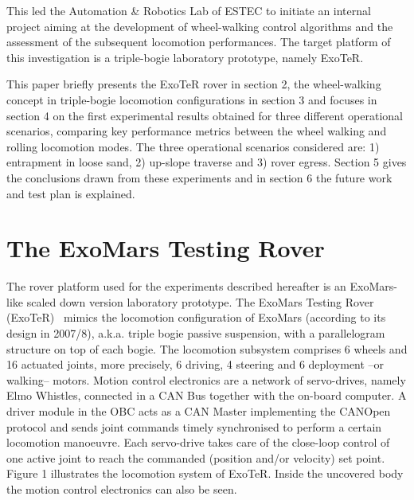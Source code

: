 \documentclass[a4paper,twocolumn]{esapub2005} %
\begin{document}
This led the Automation \& Robotics Lab of ESTEC to initiate an internal
project aiming at the development of wheel-walking control algorithms and the
assessment of the subsequent locomotion performances. The target platform of
this investigation is a triple-bogie laboratory prototype, namely ExoTeR.

This paper briefly presents the ExoTeR rover in section 2, the wheel-walking
concept in triple-bogie locomotion configurations in section 3 and focuses in
section 4 on the first experimental results obtained for three different
operational scenarios, comparing key performance metrics between the wheel
walking and rolling locomotion modes. The three operational scenarios
considered are: 1) entrapment in loose sand, 2) up-slope traverse and 3) rover
egress. Section 5 gives the conclusions drawn from these experiments and in
section 6 the future work and test plan is explained.

\section{The ExoMars Testing Rover}

The rover platform used for the experiments described hereafter is an
ExoMars-like scaled down version laboratory prototype. The ExoMars Testing
Rover (ExoTeR)~\cite{Azkarate2015} mimics the locomotion configuration of
ExoMars (according to its design in 2007/8), a.k.a. triple bogie passive
suspension, with a parallelogram structure on top of each bogie. The locomotion
subsystem comprises 6 wheels and 16 actuated joints, more precisely, 6 driving,
4 steering and 6 deployment –or walking– motors.  Motion control electronics
are a network of servo-drives, namely Elmo Whistles, connected in a CAN Bus
together with the on-board computer. A driver module in the OBC acts as a CAN
Master implementing the CANOpen protocol and sends joint commands timely
synchronised to perform a certain locomotion manoeuvre. Each servo-drive takes
care of the close-loop control of one active joint to reach the commanded
(position and/or velocity) set point.  Figure 1 illustrates the locomotion
system of ExoTeR. Inside the uncovered body the motion control electronics can
also be seen.
\end{document}
